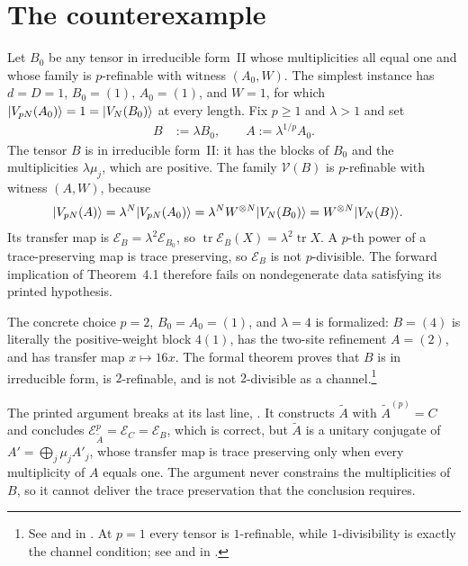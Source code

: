 \documentclass{article}
\begin{document}
\section{The counterexample}

Let $B_0$ be any tensor in irreducible form~II whose multiplicities all equal
one and whose family is $p$-refinable with witness $(A_0,W)$. The simplest
instance has $d=D=1$, $B_0=(1)$, $A_0=(1)$, and $W=1$, for which
$|V_{pN}(A_0)\rangle=1=|V_N(B_0)\rangle$ at every length. Fix $p\geq1$ and
$\lambda>1$ and set
\begin{align}
    B
     & :=\lambda B_0,
    \qquad
    A
    :=\lambda^{1/p}A_0.
    \label{eq:dccsp17_thm41_forward_trace_preservation_scaled_tensor}
\end{align}
The tensor $B$ is in irreducible form~II: it has the blocks of $B_0$ and the
multiplicities $\lambda\mu_j$, which are positive. The family
$\mathcal V(B)$ is $p$-refinable with witness $(A,W)$, because
\begin{align}
    |V_{pN}(A)\rangle
     & =\lambda^{N}|V_{pN}(A_0)\rangle
    =\lambda^{N}W^{\otimes N}|V_N(B_0)\rangle
    =W^{\otimes N}|V_N(B)\rangle.
    \label{eq:dccsp17_thm41_forward_trace_preservation_scaled_refinement}
\end{align}
Its transfer map is $\mathcal E_B=\lambda^2\mathcal E_{B_0}$, so
$\operatorname{tr}\mathcal E_B(X)=\lambda^2\operatorname{tr}X$. A $p$-th
power of a trace-preserving map is trace preserving, so $\mathcal E_B$ is not
$p$-divisible. The forward implication of Theorem~4.1 therefore fails on
nondegenerate data satisfying its printed hypothesis.

The concrete choice $p=2$, $B_0=A_0=(1)$, and $\lambda=4$ is formalized:
$B=(4)$ is literally the positive-weight block $4(1)$, has the
two-site refinement $A=(2)$, and has transfer map $x\mapsto16x$.
The formal theorem proves that $B$ is in irreducible form, is
$2$-refinable, and is not $2$-divisible as a channel.\footnote{See
     and
     in
    .
    At $p=1$ every tensor is $1$-refinable, while $1$-divisibility is
    exactly the channel condition; see 
    and  in
    .}

The printed argument breaks at its last line,
. It constructs $\widetilde A$ with
$\widetilde A^{(p)}=C$ and concludes
$\mathcal E_{\widetilde A}^p=\mathcal E_C=\mathcal E_B$, which is correct,
but $\widetilde A$ is a unitary conjugate of
$A'=\bigoplus_j\mu_j A'_j$, whose transfer map is trace preserving only when
every multiplicity of $A$ equals one. The argument never constrains the
multiplicities of $B$, so it cannot deliver the trace preservation that the
conclusion requires.
\end{document}
